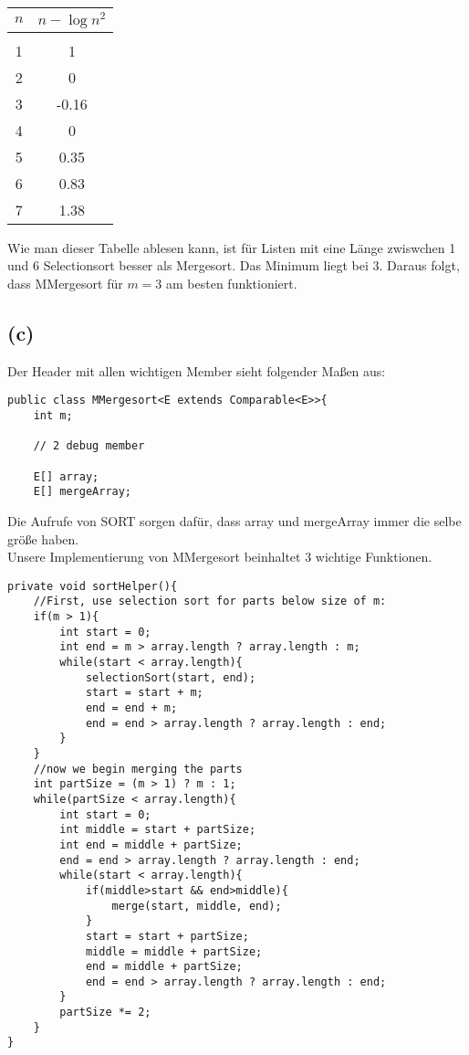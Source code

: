 \documentclass[11pt,a4paper,ngerman]{article}
\begin{document}
\begin{center}
\begin{tabular}{c|c}
$n$ & $ n - \log n^2$ \\
\hline\\
1 & 1 \\
2 & 0\\
3 & -0.16\\
4 & 0\\
5 & 0.35\\
6 & 0.83\\
7 & 1.38\\
\end{tabular}
\end{center}

Wie man dieser Tabelle ablesen kann, ist für Listen mit eine Länge zwiswchen 1 und 6 Selectionsort besser als Mergesort. Das Minimum liegt bei 3. Daraus folgt, dass MMergesort für $ m = 3$ am besten funktioniert.



\subsection*{(c)}

Der Header mit allen wichtigen Member sieht folgender Maßen aus:
\begin{lstlisting}
public class MMergesort<E extends Comparable<E>>{
	int m;

	// 2 debug member	

	E[] array;
	E[] mergeArray;
\end{lstlisting}

Die Aufrufe von SORT sorgen dafür, dass array und mergeArray immer die selbe größe haben.\\
Unsere Implementierung von MMergesort beinhaltet 3 wichtige Funktionen.\\
\begin{lstlisting}
private void sortHelper(){
	//First, use selection sort for parts below size of m:
	if(m > 1){
		int start = 0;
		int end = m > array.length ? array.length : m;
		while(start < array.length){
			selectionSort(start, end);
			start = start + m;
			end = end + m;
			end = end > array.length ? array.length : end;
		}
	}
	//now we begin merging the parts
	int partSize = (m > 1) ? m : 1;
	while(partSize < array.length){
		int start = 0;
		int middle = start + partSize;
		int end = middle + partSize;
		end = end > array.length ? array.length : end;
		while(start < array.length){
			if(middle>start && end>middle){
				merge(start, middle, end);
			}
			start = start + partSize;
			middle = middle + partSize;
			end = middle + partSize;
			end = end > array.length ? array.length : end;
		}
		partSize *= 2;
	}
}
\end{lstlisting}
\end{document}

